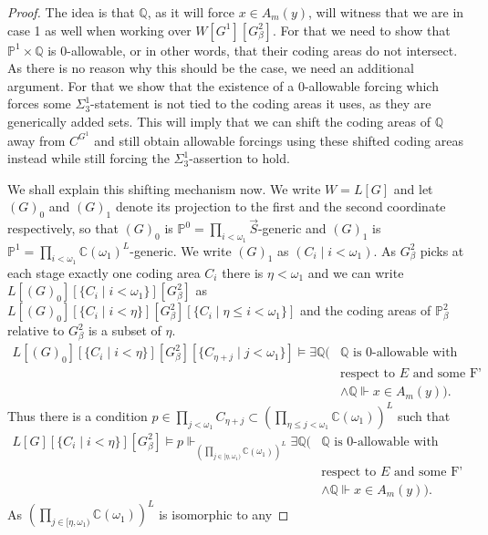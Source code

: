 \documentclass[10pt,a4paper]{amsart}
\newcommand{\forceP}{\mathbb{P}}
\newcommand{\forceQ}{\mathbb{Q}}
\begin{document}
\begin{proof}
The idea is that $ \forceQ$, as it will force $x \in A_m(y)$, will witness that we are in case 1 as well when working over $W[G^1][G^2_{\beta}]$. For that we need to show that $\forceP^1 \times \forceQ$ is 0-allowable, or in other words, that their coding areas do not intersect. As there is no reason why this should be the case, we need an additional argument. For that we show that the existence of a 0-allowable forcing which forces some $\Sigma^1_3$-statement is not tied to the coding areas it uses, as they are generically added sets. This will imply that we can shift the coding areas of $\forceQ$ away from $C^{G^1}$ and still obtain allowable forcings using these shifted coding areas instead while still forcing the $\Sigma^1_3$-assertion to hold.

We shall explain this shifting mechanism now. We write $W= L[G]$ and let $(G)_0$ and $(G)_1$ denote its projection to the first and the second coordinate respectively, so that $(G)_0$ is $\forceP^0= \prod_{i < \omega_1} \vec{S}$-generic and $(G)_1$ is $\forceP^1= \prod_{i < \omega_1} \mathbb{C}(\omega_1)^L$-generic. We write $(G)_1$ as $(C_i \mid i < \omega_1)$.  As $ G^2_{\beta}$ picks at each stage exactly one coding area $C_i$ there is $\eta < \omega_1$ and we can write $L[(G)_0][\{C_i \mid i < \omega_1 \}][G^2_{\beta}]$ as $L[(G)_0][\{C_i \mid i < \eta \}] [G^2_{\beta}] [\{C_i \mid \eta \le i < \omega_1 \}]$ and  the coding areas of $\forceP^2_{\beta}$ relative to $G^2_{\beta}$ is a subset of $\eta$.
\begin{align*}
L[(G)_0] [\{C_i \mid i < \eta \}] [G^2_{\beta}] [\{C_{\eta+ j} \mid j < \omega_1\} ] \models  \exists \forceQ (&\forceQ \text{ is } 0 \text{-allowable with} \\&
\text{respect to } E \text{ and some F' }  \\& \land \forceQ \Vdash {x} \in A_m({y})).
\end{align*}
Thus there is a condition $p \in \prod_{j<\omega_1} C_{\eta+j} \subset (\prod_{\eta \le j <\omega_1} \mathbb{C} (\omega_1))^L$
such that 
\begin{align*}
L[G] [\{C_i \mid i < \eta \}] [G^2_{\beta}] \models p  \Vdash_{(\prod_{j \in [\eta,\omega_1)} \mathbb{C} (\omega_1))^L}  \exists \forceQ (&\forceQ \text{ is } 0 \text{-allowable with} \\&
\text{respect to } E \text{ and some F' }  \\& \land \forceQ \Vdash {x} \in A_m({y})).
\end{align*}
As $(\prod_{j \in [\eta,\omega_1)} \mathbb{C} (\omega_1))^L$ is isomorphic to any 

\end{proof}
\end{document}
